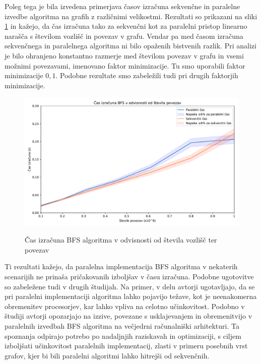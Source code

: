 \documentclass[mat1, tisk]{fmfdelo}
\begin{document}
Poleg tega je bila izvedena primerjava časov izračuna sekvenčne in paralelne izvedbe algoritma na grafih z različnimi velikostmi.
Rezultati so prikazani na sliki \ref{fig:bfs_calculation_time_by_graph_size} in kažejo, da čas izračuna tako za sekvenčni kot za paralelni
pristop linearno narašča s številom vozlišč in povezav v grafu. Vendar pa med časom izračuna sekvenčnega in paralelnega algoritma
ni bilo opaženih bistvenih razlik. Pri analizi je bilo ohranjeno konstantno razmerje med številom povezav v grafu in vsemi
možnimi povezavami, imenovano faktor minimizacije. Tu smo uporabili faktor minimizacije $0,1$. Podobne rezultate smo zabeležili
tudi pri drugih faktorjih minimizacije.

\begin{figure}[h!]
  \centering
  \caption{Čas izračuna BFS algoritma v odvisnosti od števila vozlišč ter povezav}
  \includegraphics[width=15cm]{slike/bfs_v_odvisnosti_od_velikosti_grafa.pdf}
  \label{fig:bfs_calculation_time_by_graph_size}
\end{figure}

Ti rezultati kažejo, da paralelna implementacija BFS algoritma v nekaterih scenarijih ne prinaša pričakovanih izboljšav v času izračuna.
Podobne ugotovitve so zabeležene tudi v drugih študijah. Na primer, v delu \cite{kuroiwa2020analyzing} avtorji ugotavljajo,
da se pri paralelni implementaciji algoritma lahko pojavijo težave, kot je neenakomerna obremenitev procesorjev, kar
lahko vpliva na celotno učinkovitost. Podobno v študiji \cite{rudolf2019breadth} avtorji opozarjajo na izzive, povezane
s usklajevanjem in obremenitvijo v paralelnih izvedbah BFS algoritma na večjedrni računalniški arhitekturi.
Ta spoznanja odpirajo potrebo po nadaljnjih raziskavah in optimizaciji, s ciljem izboljšati učinkovitost paralelnih implementacij,
zlasti v primeru posebnih vrst grafov, kjer bi bili paralelni algoritmi lahko hitrejši od sekvenčnih.
\end{document}
